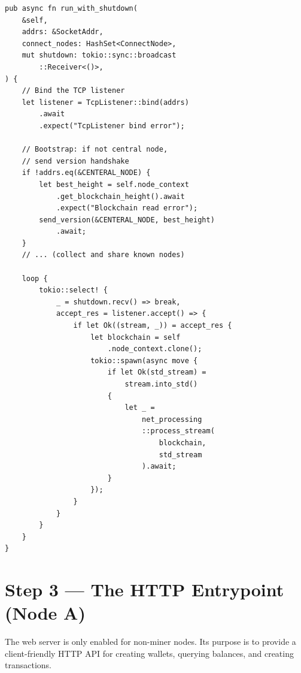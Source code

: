\begin{listing}[htbp]
\caption{P2P accept loop ()}
\label{lst:9-9-4}
\begin{verbatim}
pub async fn run_with_shutdown(
    &self,
    addrs: &SocketAddr,
    connect_nodes: HashSet<ConnectNode>,
    mut shutdown: tokio::sync::broadcast
        ::Receiver<()>,
) {
    // Bind the TCP listener
    let listener = TcpListener::bind(addrs)
        .await
        .expect("TcpListener bind error");

    // Bootstrap: if not central node,
    // send version handshake
    if !addrs.eq(&CENTERAL_NODE) {
        let best_height = self.node_context
            .get_blockchain_height().await
            .expect("Blockchain read error");
        send_version(&CENTERAL_NODE, best_height)
            .await;
    }
    // ... (collect and share known nodes)

    loop {
        tokio::select! {
            _ = shutdown.recv() => break,
            accept_res = listener.accept() => {
                if let Ok((stream, _)) = accept_res {
                    let blockchain = self
                        .node_context.clone();
                    tokio::spawn(async move {
                        if let Ok(std_stream) =
                            stream.into_std()
                        {
                            let _ =
                                net_processing
                                ::process_stream(
                                    blockchain,
                                    std_stream
                                ).await;
                        }
                    });
                }
            }
        }
    }
}
\end{verbatim}
\end{listing}

\section{Step 3 --- The HTTP Entrypoint (Node A)}
\label{sec:ch09-9-step3}

The web server is only enabled for non-miner nodes. Its purpose is to provide a client-friendly HTTP API for creating wallets, querying balances, and creating transactions.

